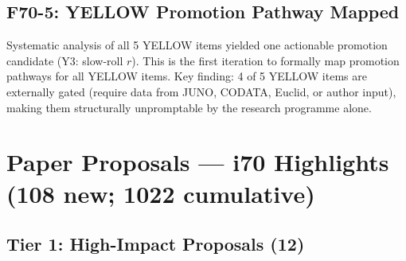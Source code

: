 \documentclass[11pt,a4paper]{article}
\begin{document}
\subsection{F70-5: YELLOW Promotion Pathway Mapped}

Systematic analysis of all 5 YELLOW items yielded one actionable promotion candidate (Y3: slow-roll $r$). This is the first iteration to formally map promotion pathways for all YELLOW items. Key finding: 4 of 5 YELLOW items are externally gated (require data from JUNO, CODATA, Euclid, or author input), making them structurally unpromptable by the research programme alone.


\section{Paper Proposals --- i70 Highlights (108 new; 1022 cumulative)}

\subsection{Tier 1: High-Impact Proposals (12)}
\end{document}

